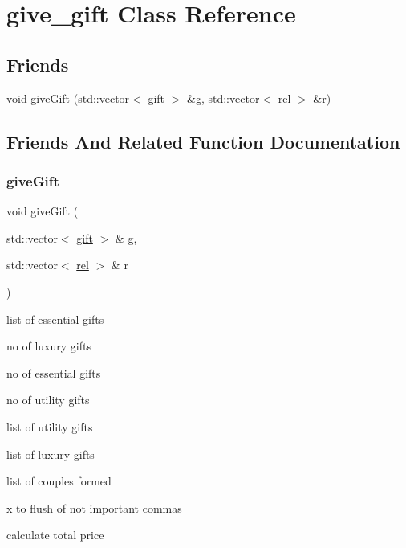 \hypertarget{classgive__gift}{}\section{give\+\_\+gift Class Reference}
\label{classgive__gift}
\subsection*{Friends}
\begin{DoxyCompactItemize}
\item 
void \hyperlink{classgive__gift_a4d58aac625b116fce2965ee8ed463409}{give\+Gift} (std\+::vector$<$ \hyperlink{classgift}{gift} $>$ \&g, std\+::vector$<$ \hyperlink{classrel}{rel} $>$ \&r)
\end{DoxyCompactItemize}


\subsection{Friends And Related Function Documentation}
\mbox{\label{classgive__gift_a4d58aac625b116fce2965ee8ed463409}} 
\subsubsection{\texorpdfstring{give\+Gift}{giveGift}}
{\footnotesize\ttfamily void give\+Gift (\begin{DoxyParamCaption}\item[{std\+::vector$<$ \hyperlink{classgift}{gift} $>$ \&}]{g,  }\item[{std\+::vector$<$ \hyperlink{classrel}{rel} $>$ \&}]{r }\end{DoxyParamCaption})\hspace{0.3cm}{\ttfamily [friend]}}

list of essential gifts

no of luxury gifts

no of essential gifts

no of utility gifts

list of utility gifts

list of luxury gifts

list of couples formed

x to flush of not important commas

calculate total price

